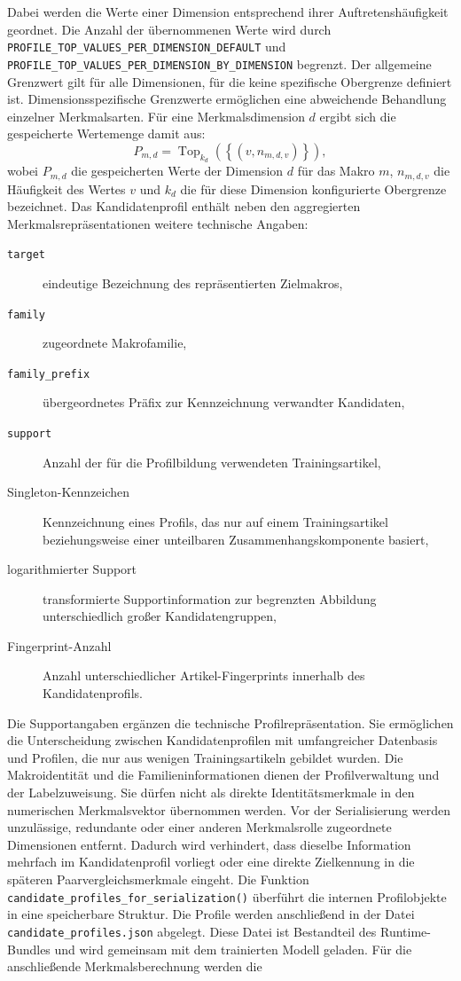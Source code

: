 Dabei werden die Werte einer Dimension entsprechend ihrer Auftretenshäufigkeit geordnet. Die Anzahl der übernommenen Werte wird durch \texttt{PROFILE\_TOP\_VALUES\_PER\_DIMENSION\_DEFAULT} und \texttt{PROFILE\_TOP\_VALUES\_PER\_DIMENSION\_BY\_DIMENSION} begrenzt. Der allgemeine Grenzwert gilt für alle Dimensionen, für die keine spezifische Obergrenze definiert ist. Dimensionsspezifische Grenzwerte ermöglichen eine abweichende Behandlung einzelner Merkmalsarten. Für eine Merkmalsdimension $d$ ergibt sich die gespeicherte Wertemenge damit aus: \begin{equation} P_{m,d} = \operatorname{Top}_{k_d} \left( \left\{ \left(v,n_{m,d,v}\right) \right\} \right), \label{eq:kandidatenprofil_aggregation} \end{equation} wobei $P_{m,d}$ die gespeicherten Werte der Dimension $d$ für das Makro $m$, $n_{m,d,v}$ die Häufigkeit des Wertes $v$ und $k_d$ die für diese Dimension konfigurierte Obergrenze bezeichnet. Das Kandidatenprofil enthält neben den aggregierten Merkmalsrepräsentationen weitere technische Angaben: \begin{description} \item[\texttt{target}] eindeutige Bezeichnung des repräsentierten Zielmakros, \item[\texttt{family}] zugeordnete Makrofamilie, \item[\texttt{family\_prefix}] übergeordnetes Präfix zur Kennzeichnung verwandter Kandidaten, \item[\texttt{support}] Anzahl der für die Profilbildung verwendeten Trainingsartikel, \item[Singleton-Kennzeichen] Kennzeichnung eines Profils, das nur auf einem Trainingsartikel beziehungsweise einer unteilbaren Zusammenhangskomponente basiert, \item[logarithmierter Support] transformierte Supportinformation zur begrenzten Abbildung unterschiedlich großer Kandidatengruppen, \item[Fingerprint-Anzahl] Anzahl unterschiedlicher Artikel-Fingerprints innerhalb des Kandidatenprofils. \end{description} Die Supportangaben ergänzen die technische Profilrepräsentation. Sie ermöglichen die Unterscheidung zwischen Kandidatenprofilen mit umfangreicher Datenbasis und Profilen, die nur aus wenigen Trainingsartikeln gebildet wurden. Die Makroidentität und die Familieninformationen dienen der Profilverwaltung und der Labelzuweisung. Sie dürfen nicht als direkte Identitätsmerkmale in den numerischen Merkmalsvektor übernommen werden. Vor der Serialisierung werden unzulässige, redundante oder einer anderen Merkmalsrolle zugeordnete Dimensionen entfernt. Dadurch wird verhindert, dass dieselbe Information mehrfach im Kandidatenprofil vorliegt oder eine direkte Zielkennung in die späteren Paarvergleichsmerkmale eingeht. Die Funktion \texttt{candidate\_profiles\_for\_serialization()} überführt die internen Profilobjekte in eine speicherbare Struktur. Die Profile werden anschließend in der Datei \texttt{candidate\_profiles.json} abgelegt. Diese Datei ist Bestandteil des Runtime-Bundles und wird gemeinsam mit dem trainierten Modell geladen. Für die anschließende Merkmalsberechnung werden die 